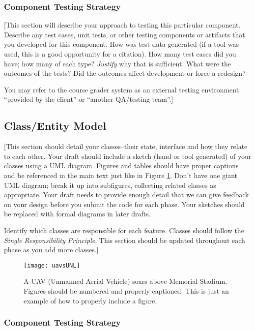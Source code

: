 \documentclass[12pt]{scrartcl} %
\begin{document}
\subsubsection{Component Testing Strategy}

[This section will describe your approach to testing this particular 
component.  Describe any test cases, unit tests, or other testing 
components or artifacts that you developed for this component.  How
was test data generated (if a tool was used, this is a good opportunity
for a citation).  How many test cases did you have; how many of each type?  
\emph{Justify} why that is sufficient.  What were the outcomes of the tests?
Did the outcomes affect development or force a redesign?

You may refer to the course grader system as an external testing 
environment ``provided by the client'' or ``another QA/testing team''.]


\subsection{Class/Entity Model}

[This section should detail your classes--their state, interface and how 
they relate to each other.  Your draft should include a sketch (hand or
tool generated) of your classes using a UML diagram.  Figures and tables 
should have proper captions and be referenced in the main text just 
like in Figure \ref{figure:uav}.  Don't have one giant UML diagram; 
break it up into subfigures, collecting related classes as appropriate.
Your draft needs to provide enough detail that we can give feedback on 
your design before you submit the code for each phase.  Your sketches
should be replaced with formal diagrams in later drafts.

Identify which classes are responsible for each feature.  Classes should
follow the \emph{Single Responsibility Principle}.  This section should
be updated throughout each phase as you add more classes.]

\begin{figure}[h]%
\centering
\texttt{[image: uavsUNL]}
\caption{A UAV (Unmanned Aerial Vehicle) soars above Memorial Stadium.  Figures should be numbered and properly captioned.  This is just an example of how to properly include a figure.}
\label{figure:uav}
\end{figure}

\subsubsection{Component Testing Strategy}
\end{document}
